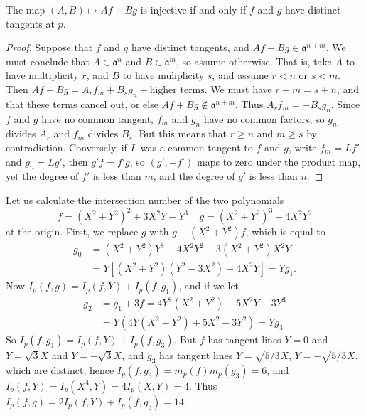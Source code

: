 \begin{lemma}
    The map $(A,B) \mapsto Af + Bg$ is injective if and only if $f$ and $g$ have distinct tangents at $p$.
\end{lemma}
\begin{proof}
    Suppose that $f$ and $g$ have distinct tangents, and $Af + Bg \in \mathfrak{a}^{n+m}$. We must conclude that $A \in \mathfrak{a}^n$ and $B \in \mathfrak{a}^m$, so assume otherwise. That is, take $A$ to have multiplicity $r$, and $B$ to have muliplicity $s$, and assume $r < n$ or $s < m$. Then $Af + Bg = A_rf_m + B_sg_n + \text{higher terms}$. We must have $r + m = s + n$, and that these terms cancel out, or else $Af + Bg \not \in \mathfrak{a}^{n+m}$. Thus $A_rf_m = -B_sg_n$. Since $f$ and $g$ have no common tangent, $f_m$ and $g_n$ have no common factors, so $g_n$ divides $A_r$ and $f_m$ divides $B_s$. But this means that $r \geq n$ and $m \geq s$ by contradiction. Conversely, if $L$ was a common tangent to $f$ and $g$, write $f_m = Lf'$ and $g_n = Lg'$, then $g'f = f'g$, so $(g',-f')$ maps to zero under the product map, yet the degree of $f'$ is less than $m$, and the degree of $g'$ is less than $n$.
\end{proof}

\begin{example}
    Let us calculate the intersection number of the two polynomials
    \[ f = (X^2 + Y^2)^2 + 3X^2Y - Y^3\ \ \ \ \ g = (X^2 + Y^2)^3 - 4X^2Y^2 \]
    at the origin. First, we replace $g$ with $g-(X^2 + Y^2)f$, which is equal to
    \begin{align*}
        g_0 &= (X^2 + Y^2)Y^3 - 4X^2Y^2 - 3(X^2 + Y^2)X^2Y\\
        &= Y[(X^2 + Y^2)(Y^2 - 3X^2) - 4X^2Y] = Yg_1.
    \end{align*}
    Now $I_p(f,g) = I_p(f,Y) + I_p(f,g_1)$, and if we let
    \begin{align*}
        g_2 &= g_1 + 3f = 4Y^2(X^2 + Y^2) + 5X^2Y - 3Y^3\\
        &= Y(4Y(X^2 + Y^2) + 5X^2 - 3Y^2) = Yg_3
    \end{align*}
    So $I_p(f,g_1) = I_p(f,Y) + I_p(f,g_3)$. But $f$ has tangent lines $Y = 0$ and $Y = \sqrt{3}X$ and $Y = -\sqrt{3}X$, and $g_3$ has tangent lines $Y = \sqrt{5/3}X$, $Y = -\sqrt{5/3}X$, which are distinct, hence $I_p(f,g_3) = m_p(f)m_p(g_3) = 6$, and $I_p(f,Y) = I_p(X^4,Y) = 4I_p(X,Y) = 4$. Thus $I_p(f,g) = 2I_p(f,Y) + I_p(f,g_3) = 14$.
\end{example}

